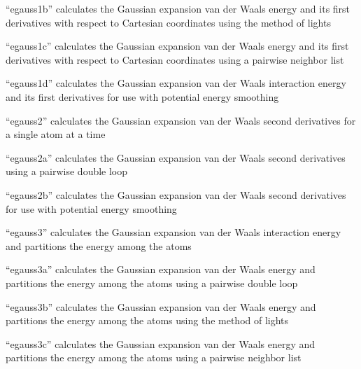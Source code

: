 \documentclass[letterpaper,11pt,english]{sphinxmanual}
\begin{document}

“egauss1b” calculates the Gaussian expansion van der Waals
energy and its first derivatives with respect to Cartesian
coordinates using the method of lights


“egauss1c” calculates the Gaussian expansion van der Waals
energy and its first derivatives with respect to Cartesian
coordinates using a pairwise neighbor list


“egauss1d” calculates the Gaussian expansion van der Waals
interaction energy and its first derivatives for use with
potential energy smoothing


“egauss2” calculates the Gaussian expansion van der Waals
second derivatives for a single atom at a time


“egauss2a” calculates the Gaussian expansion van der Waals
second derivatives using a pairwise double loop


“egauss2b” calculates the Gaussian expansion van der Waals
second derivatives for use with potential energy smoothing


“egauss3” calculates the Gaussian expansion van der Waals
interaction energy and partitions the energy among the atoms


“egauss3a” calculates the Gaussian expansion van der Waals
energy and partitions the energy among the atoms using a
pairwise double loop


“egauss3b” calculates the Gaussian expansion van der Waals
energy and partitions the energy among the atoms using the
method of lights


“egauss3c” calculates the Gaussian expansion van der Waals
energy and partitions the energy among the atoms using a
pairwise neighbor list

\end{document}
